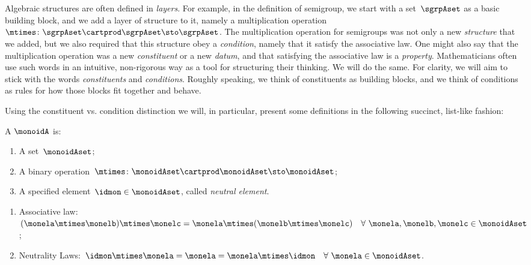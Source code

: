 

\section{}
\label{sec:parallelism-monoids}

Algebraic structures are often defined in \emph{layers}.
For example, in the definition of semigroup, we start with a set~$\sgrpAset$ as a basic building block, and we add a layer of structure to it, namely a multiplication operation~$\mtimes \colon \sgrpAset \cartprod \sgrpAset \sto \sgrpAset$.
The multiplication operation for semigroups was not only a new \emph{structure} that we added, but we also required that this structure obey a \emph{condition}, namely that it satisfy the associative law.
One might also say that the multiplication operation was a new \emph{constituent} or a new \emph{datum}, and that satisfying the associative law is a \emph{property}.
Mathematicians often use such words in an intuitive, non-rigorous way as a tool for structuring their thinking.
We will do the same.
For clarity, we will aim to stick with the words \emph{constituents} and \emph{conditions}.
Roughly speaking, we think of constituents as building blocks, and we think of conditions as rules for how those blocks fit together and behave.

Using the constituent vs. condition distinction we will, in particular, present some definitions in the following succinct, list-like fashion:

\begin{ctdefinition}[Monoid]
  \label{def:monoid}
  A \emph{}  $\monoidA$  is:
  \begin{body}
    \constit
    \begin{enumerate}
      \item A set~$\monoidAset$;
      \item A binary operation~$\mtimes  \colon \monoidAset \cartprod \monoidAset \sto \monoidAset$;
      \item A specified element~$\idmon \in \monoidAset$, called \emph{neutral element}.
    \end{enumerate}
    \condit
    \begin{enumerate}
      \item Associative law:~$(\monela\mtimes  \monelb)\mtimes  \monelc=
      \monela\mtimes  (\monelb\mtimes  \monelc) \quad  \forall \  \monela, \monelb, \monelc \in \monoidAset$;
      \item Neutrality Laws:~$\idmon\mtimes \monela=\monela=\monela\mtimes  \idmon \quad  \forall \ \monela \in \monoidAset $.
    \end{enumerate}
  \end{body}
\end{ctdefinition}


